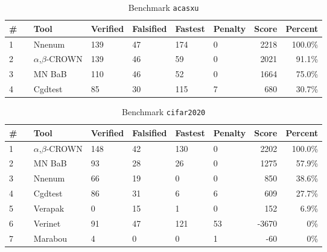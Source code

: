 

\begin{table}[h]
\begin{center}
\caption{Benchmark \texttt{acasxu}} \label{tab:cat_{cat}}
{\setlength{\tabcolsep}{2pt}
\begin{tabular}[h]{@{}llllllrr@{}}
\toprule
\textbf{\# ~} & \textbf{Tool} & \textbf{Verified} & \textbf{Falsified} & \textbf{Fastest} & \textbf{Penalty} & \textbf{Score} & \textbf{Percent}\\
\midrule
1 & Nnenum & 139 & 47 & 174 & 0 & 2218 & 100.0\% \\
2 & $\alpha$,$\beta$-CROWN & 139 & 46 & 59 & 0 & 2021 & 91.1\% \\
3 & MN BaB & 110 & 46 & 52 & 0 & 1664 & 75.0\% \\
4 & Cgdtest & 85 & 30 & 115 & 7 & 680 & 30.7\% \\
\bottomrule
\end{tabular}
}
\end{center}
\end{table}




\begin{table}[h]
\begin{center}
\caption{Benchmark \texttt{cifar2020}} \label{tab:cat_{cat}}
{\setlength{\tabcolsep}{2pt}
\begin{tabular}[h]{@{}llllllrr@{}}
\toprule
\textbf{\# ~} & \textbf{Tool} & \textbf{Verified} & \textbf{Falsified} & \textbf{Fastest} & \textbf{Penalty} & \textbf{Score} & \textbf{Percent}\\
\midrule
1 & $\alpha$,$\beta$-CROWN & 148 & 42 & 130 & 0 & 2202 & 100.0\% \\
2 & MN BaB & 93 & 28 & 26 & 0 & 1275 & 57.9\% \\
3 & Nnenum & 66 & 19 & 0 & 0 & 850 & 38.6\% \\
4 & Cgdtest & 86 & 31 & 6 & 6 & 609 & 27.7\% \\
5 & Verapak & 0 & 15 & 1 & 0 & 152 & 6.9\% \\
6 & Verinet & 91 & 47 & 121 & 53 & -3670 & 0\% \\
7 & Marabou & 4 & 0 & 0 & 1 & -60 & 0\% \\
\bottomrule
\end{tabular}
}
\end{center}
\end{table}


